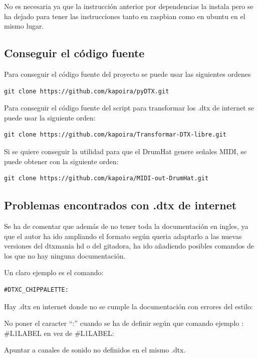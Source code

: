 \documentclass[a4paper,11pt,oneside]{book}
\begin{document}
No es necesaria ya que la instrucción anterior por dependencias la instala pero se ha dejado para tener las instrucciones tanto en raspbian como en ubuntu en el mismo lugar.

\subsection{Conseguir el código fuente}

Para conseguir el código fuente del proyecto se puede usar las siguientes ordenes
\begin{Verbatim}[frame=single]
    git clone https://github.com/kapoira/pyDTX.git
\end{Verbatim}


Para conseguir el código fuente del script para transformar los .dtx de internet se puede usar la siguiente orden:

\begin{Verbatim}[frame=single]
  git clone https://github.com/kapoira/Transformar-DTX-libre.git
\end{Verbatim}

Si se quiere conseguir la utilidad para que el DrumHat genere señales MIDI, se puede obtener con la siguiente orden:

\begin{Verbatim}[frame=single]
    git clone https://github.com/kapoira/MIDI-out-DrumHat.git
\end{Verbatim}

\subsection{Problemas encontrados con .dtx de internet}
Se ha de comentar que además de no tener toda la documentación en ingles, ya que el autor ha ido ampliando el formato según queria adaptarlo a las nuevas versiones del dtxmania hd o del gitadora, ha ido añadiendo posibles comandos de los que no hay ninguna documentación.

Un claro ejemplo es el comando:

\begin{Verbatim}[frame=single]
#DTXC_CHIPPALETTE: 
\end{Verbatim}


Hay .dtx en internet donde no se cumple la documentación con errores del estilo:

No poner el caracter ``:'' cuando se ha de definir según que comando ejemplo : \#L1LABEL en vez de \#L1LABEL:

Apuntar a canales de sonido no definidos en el mismo .dtx.
\end{document}
